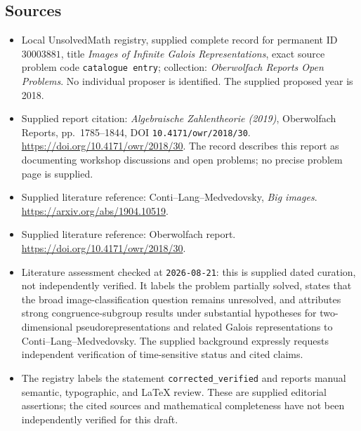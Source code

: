 \documentclass[11pt]{article}
\begin{document}
\subsection{Sources}
\begin{itemize}
\item Local UnsolvedMath registry, supplied complete record for permanent ID \(30003881\), title \emph{Images of Infinite Galois Representations}, exact source problem code \texttt{catalogue entry}; collection: \emph{Oberwolfach Reports Open Problems}. No individual proposer is identified. The supplied proposed year is 2018.
\item Supplied report citation: \emph{Algebraische Zahlentheorie (2019)}, Oberwolfach Reports, pp.~1785--1844, DOI \texttt{10.4171/owr/2018/30}. \url{https://doi.org/10.4171/owr/2018/30}. The record describes this report as documenting workshop discussions and open problems; no precise problem page is supplied.
\item Supplied literature reference: Conti--Lang--Medvedovsky, \emph{Big images}. \url{https://arxiv.org/abs/1904.10519}.
\item Supplied literature reference: Oberwolfach report. \url{https://doi.org/10.4171/owr/2018/30}.
\item Literature assessment checked at \texttt{2026-08-21}: this is supplied dated curation, not independently verified. It labels the problem partially solved, states that the broad image-classification question remains unresolved, and attributes strong congruence-subgroup results under substantial hypotheses for two-dimensional pseudorepresentations and related Galois representations to Conti--Lang--Medvedovsky. The supplied background expressly requests independent verification of time-sensitive status and cited claims.
\item The registry labels the statement \texttt{corrected\_verified} and reports manual semantic, typographic, and LaTeX review. These are supplied editorial assertions; the cited sources and mathematical completeness have not been independently verified for this draft.
\end{itemize}
\end{document}
